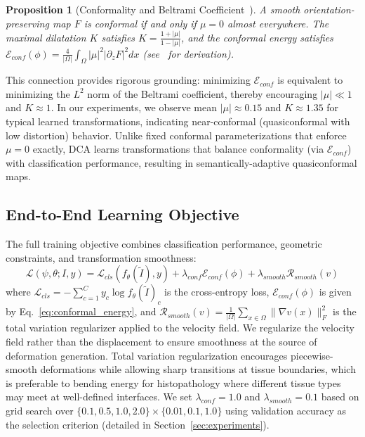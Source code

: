 \documentclass[final,3p,times,review,sort&compress]{elsarticle}
\newtheorem{proposition}{Proposition}
\begin{document}
\begin{proposition}[Conformality and Beltrami Coefficient~\cite{ahlfors2006conformal}]
\label{prop:beltrami}
A smooth orientation-preserving map $F$ is conformal if and only if $\mu = 0$ almost everywhere. The maximal dilatation $K$ satisfies $K = \frac{1 + |\mu|}{1 - |\mu|}$, and the conformal energy satisfies $\mathcal{E}_{conf}(\phi) = \frac{4}{|\Omega|} \int_\Omega |\mu|^2 | \partial_z F |^2 dx$ (see~\cite{lui2014brain} for derivation).
\end{proposition}

This connection provides rigorous grounding: minimizing $\mathcal{E}_{conf}$ is equivalent to minimizing the $L^2$ norm of the Beltrami coefficient, thereby encouraging $|\mu| \ll 1$ and $K \approx 1$. In our experiments, we observe mean $|\mu| \approx 0.15$ and $K \approx 1.35$ for typical learned transformations, indicating near-conformal (quasiconformal with low distortion) behavior. Unlike fixed conformal parameterizations that enforce $\mu = 0$ exactly, DCA learns transformations that balance conformality (via $\mathcal{E}_{conf}$) with classification performance, resulting in semantically-adaptive quasiconformal maps.

\subsection{End-to-End Learning Objective}

The full training objective combines classification performance, geometric constraints, and transformation smoothness:
\begin{equation}
\mathcal{L}(\psi, \theta; I, y) = \mathcal{L}_{cls}(f_\theta(\tilde{I}), y) + \lambda_{conf} \mathcal{E}_{conf}(\phi) + \lambda_{smooth} \mathcal{R}_{smooth}(v)
\label{eq:full_loss}
\end{equation}
where $\mathcal{L}_{cls} = -\sum_{c=1}^C y_c \log f_\theta(\tilde{I})_c$ is the cross-entropy loss, $\mathcal{E}_{conf}(\phi)$ is given by Eq.~\eqref{eq:conformal_energy}, and $\mathcal{R}_{smooth}(v) = \frac{1}{|\Omega|} \sum_{x \in \Omega} \|\nabla v(x)\|_F^2$ is the total variation regularizer applied to the velocity field. We regularize the velocity field rather than the displacement to ensure smoothness at the source of deformation generation. Total variation regularization encourages piecewise-smooth deformations while allowing sharp transitions at tissue boundaries, which is preferable to bending energy for histopathology where different tissue types may meet at well-defined interfaces. We set $\lambda_{conf} = 1.0$ and $\lambda_{smooth} = 0.1$ based on grid search over $\{0.1, 0.5, 1.0, 2.0\} \times \{0.01, 0.1, 1.0\}$ using validation accuracy as the selection criterion (detailed in Section~\ref{sec:experiments}).
\end{document}
